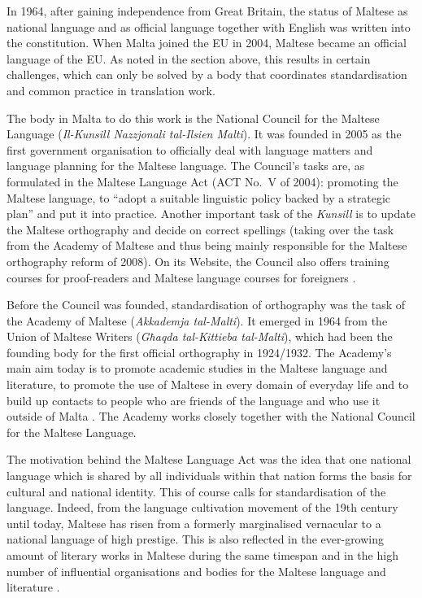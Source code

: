 \begin{multicols}{2}
In 1964, after gaining independence from Great Britain, the status of Maltese as national language and as official language together with English was written into the constitution. When Malta joined the EU in 2004, Maltese became an official language of the EU. As noted in the section above, this results in certain challenges, which can only be solved by a body that coordinates standardisation and common practice in translation work.

The body in Malta to do this work is the National Council for the Maltese Language (\emph{Il-Kunsill Nazzjonali tal-Ilsien Malti}). It was founded in 2005 as the first government organisation to officially deal with language matters and language planning for the Maltese language. The Council's tasks are, as formulated in the Maltese Language Act (ACT No.~V of 2004): promoting the Maltese language, to ``adopt a suitable linguistic policy backed by a strategic plan'' and put it into practice. Another important task of the \emph{Kunsill} is to update the Maltese orthography and decide on correct spellings (taking over the task from the Academy of Maltese and thus being mainly responsible for the Maltese orthography reform of 2008). On its Website, the Council also offers training courses for proof-readers and Maltese language courses for foreigners \cite{Kunsill1}. 

Before the Council was founded, standardisation of orthography was the task of the Academy of Maltese (\emph{Akkademja tal-Malti}). It emerged in 1964 from the Union of Maltese Writers (\emph{Għaqda tal-Kittieba tal-Malti}), which had been the founding body for the first official orthography in 1924/1932. The Academy's main aim today is to promote academic studies in the Maltese language and literature, to promote the use of Maltese in every domain of everyday life and to build up contacts to people who are friends of the language and who use it outside of Malta \cite{Akkademja1}. The Academy works closely together with the National Council for the Maltese Language.

The motivation behind the Maltese Language Act was the idea that one national language which is shared by all individuals within that nation forms the basis for cultural and national identity. This of course calls for standardisation of the language. Indeed, from the language cultivation movement of the 19th century until today, Maltese has risen from a formerly marginalised vernacular to a national language of high prestige. This is also reflected in the ever-growing amount of literary works in Maltese during the same timespan and in the high number of influential organisations and bodies for the Maltese language and literature \cite{Fabri:2011a}.


\end{multicols}

